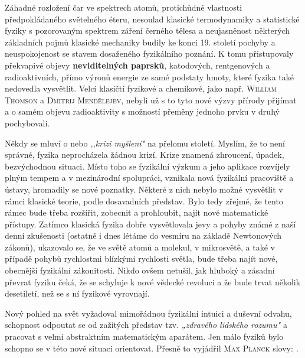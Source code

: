       Záhadné rozložení čar ve spektrech atomů, protichůdné vlastnosti předpokládaného světelného
      éteru, nesoulad klasické termodynamiky a statistické fyziky s pozorovaným spektrem záření
      černého tělesa a neujasněnost některých základních pojmů klasické mechaniky budily ke konci
      19. století pochyby a neuspokojenost se stavem dosaženého fyzikálního poznání. K tomu
      přistupovaly překvapivé objevy \textbf{neviditelných paprsků}, katodových, rentgenových a
      radioaktivních, přímo výronů energie ze samé podstaty hmoty, které fyzika také nedovedla
      vysvětlit. Velcí klasičtí fyzikové a chemikové, jako např. \textsc{William Thomson} a
      \textsc{Dmitrij Mendělejev}, nebyli už s to tyto nové výzvy přírody přijímat a o samém objevu
      radioaktivity s možností přeměny jednoho prvku v druhý pochybovali.

      Někdy se mluví o \emph{} nebo \emph{,,krizi myšlení"} na přelomu století.
      Myslím, že to není správné, fyzika neprocházela žádnou krizí. Krize znamená zhroucení, úpadek,
      bezvýchodnou situaci. Místo toho se fyzikální výzkum a jeho aplikace rozvíjely plným tempem a
      v mezinárodní spolupráci, vznikala nová fyzikální pracoviště a ústavy, hromadily se nové
      poznatky. Některé z nich nebylo možné vysvětlit v rámci klasické teorie, podle dosavadních
      představ. Bylo tedy zřejmé, že tento rámec bude třeba rozšířit, zobecnit a prohloubit, najít
      nové matematické přístupy. Zatímco klasická fyzika dobře vysvětlovala jevy a pohyby známé z
      naší denní zkušenosti (ostatně i dnes létáme do vesmíru na základě Newtonových zákonů),
      ukazovalo se, že ve světě atomů a molekul, v mikrosvětě, a také v případě pohybů rychlostmi
      blízkými rychlosti světla, bude třeba najít nové, obecnější fyzikální zákonitosti. Nikdo ovšem
      netušil, jak hluboký a zásadní převrat fyziku čeká, že se schyluje k nové vědecké revoluci a
      že bude trvat několik desetiletí, než se s ní fyzikové vyrovnají.

      Nový pohled na svět vyžadoval mimořádnou fyzikální intuici a duševní odvahu, schopnost
      odpoutat se od zažitých představ tzv. \emph{„zdravého lidského rozumu"} a pracovat s velmi
      abstraktním matematickým aparátem. Jen málo fyziků bylo schopno se v této nové situaci
      orientovat. Přesně to vyjádřil \textsc{Max Planck} slovy: \emph{.}

